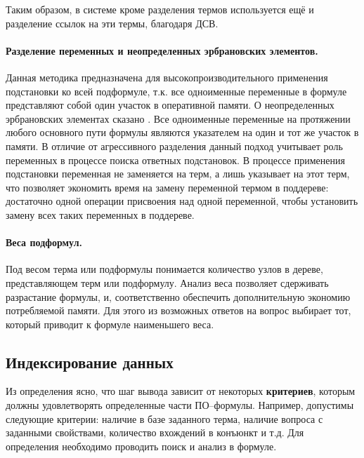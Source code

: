 Таким образом, в системе кроме разделения термов используется ещё и разделение ссылок на эти термы, благодаря ДСВ. 

\paragraph{Разделение переменных и неопределенных эрбрановских элементов.} Данная методика предназначена для высокопроизводительного применения подстановки ко всей подформуле, т.к. все одноименные переменные в формуле представляют собой один участок в оперативной памяти. О неопределенных эрбрановских элементах сказано . Все одноименные переменные на протяжении любого основного пути формулы \cite{dissChe} являются указателем на один и тот же участок в памяти. В отличие от агрессивного разделения данный подход учитывает роль переменных в процессе поиска ответных подстановок. В процессе применения подстановки переменная не заменяется на терм, а лишь указывает на этот терм, что позволяет экономить время на замену переменной термом в поддереве: достаточно одной операции присвоения над одной переменной, чтобы установить замену всех таких переменных в поддереве.

\paragraph{Веса подформул.} Под весом терма или подформулы понимается количество узлов в дереве, представляющем терм или подформулу. Анализ веса позволяет сдерживать разрастание формулы, и, соответственно обеспечить дополнительную экономию потребляемой памяти. Для этого из возможных ответов на вопрос выбирает  тот, который приводит к формуле наименьшего веса.


\subsection{Индексирование данных}

Из определения  ясно, что шаг вывода зависит от некоторых \textbf{критериев}, которым должны удовлетворять определенные части ПО--формулы. Например, допустимы следующие критерии: наличие в базе заданного терма, наличие вопроса с заданными свойствами, количество вхождений  в конъюнкт и т.д. Для определения  необходимо проводить поиск и анализ  в формуле. 

